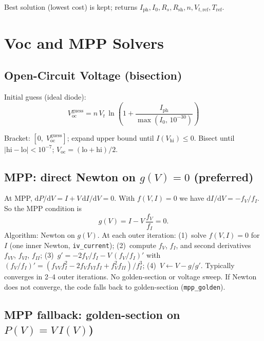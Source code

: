 \documentclass[11pt,a4paper]{article}
\begin{document}
Best solution (lowest cost) is kept; returns \(I_{\mathrm{ph}}, I_0, R_s, R_{\mathrm{sh}}, n, V_{t,\mathrm{ref}}, T_{\mathrm{ref}}\).

\section{Voc and MPP Solvers}

\subsection{Open-Circuit Voltage (bisection)}

Initial guess (ideal diode):
\begin{equation}
  V_{\mathrm{oc}}^{\mathrm{guess}} = n\,V_t\,\ln\left(1 + \frac{I_{\mathrm{ph}}}{\max(I_0,\,10^{-30})}\right)
\end{equation}

Bracket: \([0,\; V_{\mathrm{oc}}^{\mathrm{guess}}]\); expand upper bound until \(I(V_{\mathrm{hi}}) \le 0\). Bisect until \(|\mathrm{hi} - \mathrm{lo}| < 10^{-7}\); \(V_{\mathrm{oc}} = (\mathrm{lo}+\mathrm{hi})/2\).

\subsection{MPP: direct Newton on \(g(V)=0\) (preferred)}

At MPP, \(\mathrm{d}P/\mathrm{d}V = I + V\,\mathrm{d}I/\mathrm{d}V = 0\). With \(f(V,I)=0\) we have \(\mathrm{d}I/\mathrm{d}V = -f_V/f_I\). So the MPP condition is
\begin{equation}
  g(V) = I - V\,\frac{f_V}{f_I} = 0.
\end{equation}
Algorithm: Newton on \(g(V)\). At each outer iteration: (1)~solve \(f(V,I)=0\) for \(I\) (one inner Newton, \texttt{iv\_current}); (2)~compute \(f_V\), \(f_I\), and second derivatives \(f_{VV}\), \(f_{VI}\), \(f_{II}\); (3)~\(g' = -2 f_V/f_I - V\,(f_V/f_I)'\) with \((f_V/f_I)' = (f_{VV}f_I^2 - 2 f_V f_{VI} f_I + f_V^2 f_{II})/f_I^3\); (4)~\(V \leftarrow V - g/g'\). Typically converges in 2--4 outer iterations. No golden-section or voltage sweep. If Newton does not converge, the code falls back to golden-section (\texttt{mpp\_golden}).

\subsection{MPP fallback: golden-section on \(P(V) = V\,I(V)\))}
\end{document}

